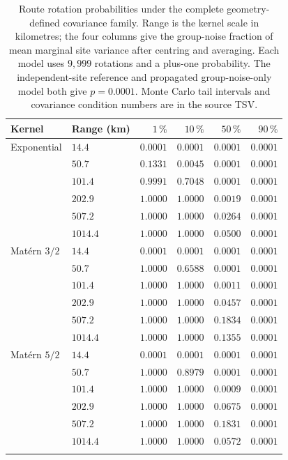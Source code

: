 \documentclass[11pt]{article}
\begin{document}
\begin{table}[htbp]\centering\small
\caption{Route rotation probabilities under the complete geometry-defined covariance family. Range is the kernel scale in kilometres; the four columns give the group-noise fraction of mean marginal site variance after centring and averaging. Each model uses $9{,}999$ rotations and a plus-one probability. The independent-site reference and propagated group-noise-only model both give $p=0.0001$. Monte Carlo tail intervals and covariance condition numbers are in the source TSV.}
\label{tab:spatial_covariance}
\begin{tabular}{llrrrr}\toprule
Kernel & Range (km) & $1\,\%$ & $10\,\%$ & $50\,\%$ & $90\,\%$ \\\midrule
Exponential & $14.4$ & $0.0001$ & $0.0001$ & $0.0001$ & $0.0001$ \\
 & $50.7$ & $0.1331$ & $0.0045$ & $0.0001$ & $0.0001$ \\
 & $101.4$ & $0.9991$ & $0.7048$ & $0.0001$ & $0.0001$ \\
 & $202.9$ & $1.0000$ & $1.0000$ & $0.0019$ & $0.0001$ \\
 & $507.2$ & $1.0000$ & $1.0000$ & $0.0264$ & $0.0001$ \\
 & $1014.4$ & $1.0000$ & $1.0000$ & $0.0500$ & $0.0001$ \\
\addlinespace
Mat\'ern $3/2$ & $14.4$ & $0.0001$ & $0.0001$ & $0.0001$ & $0.0001$ \\
 & $50.7$ & $1.0000$ & $0.6588$ & $0.0001$ & $0.0001$ \\
 & $101.4$ & $1.0000$ & $1.0000$ & $0.0011$ & $0.0001$ \\
 & $202.9$ & $1.0000$ & $1.0000$ & $0.0457$ & $0.0001$ \\
 & $507.2$ & $1.0000$ & $1.0000$ & $0.1834$ & $0.0001$ \\
 & $1014.4$ & $1.0000$ & $1.0000$ & $0.1355$ & $0.0001$ \\
\addlinespace
Mat\'ern $5/2$ & $14.4$ & $0.0001$ & $0.0001$ & $0.0001$ & $0.0001$ \\
 & $50.7$ & $1.0000$ & $0.8979$ & $0.0001$ & $0.0001$ \\
 & $101.4$ & $1.0000$ & $1.0000$ & $0.0009$ & $0.0001$ \\
 & $202.9$ & $1.0000$ & $1.0000$ & $0.0675$ & $0.0001$ \\
 & $507.2$ & $1.0000$ & $1.0000$ & $0.1831$ & $0.0001$ \\
 & $1014.4$ & $1.0000$ & $1.0000$ & $0.0572$ & $0.0001$ \\
\addlinespace
\bottomrule\end{tabular}\end{table}
\end{document}
